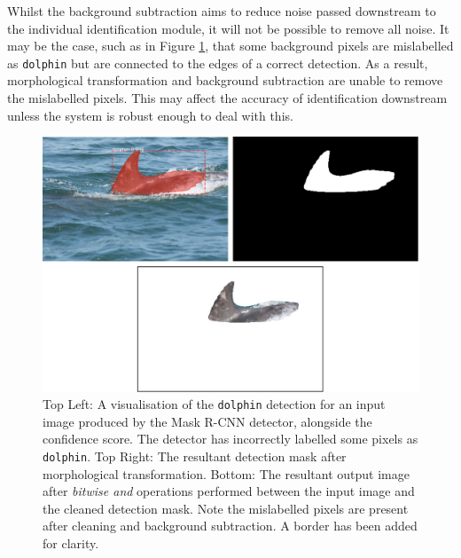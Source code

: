 Whilst the background subtraction aims to reduce noise passed downstream to the individual identification module, it will not be possible to remove all noise. It may be the case, such as in Figure \ref{fig:fin-extraction-unclean}, that some background pixels are mislabelled as \texttt{dolphin} but are connected to the edges of a correct detection. As a result, morphological transformation and background subtraction are unable to remove the mislabelled pixels. This may affect the accuracy of identification downstream unless the system is robust enough to deal with this.

\begin{figure}
	\begin{center}
		\includegraphics[scale=0.5]{Chapter3/figs/fin-extraction-unclean-uncropped.png}
	\end{center}
	\caption[Top Left: A visualisation of the \texttt{dolphin} detection for an input image produced by the Mask R-CNN detector, alongside the confidence score. Top Right: The resultant detection mask after morphological transformation. Bottom: The resultant output image after \textit{bitwise and} operations performed between the input image and the cleaned detection mask.]{Top Left: A visualisation of the \texttt{dolphin} detection for an input image produced by the Mask R-CNN detector, alongside the confidence score. The detector has incorrectly labelled some pixels as \texttt{dolphin}. Top Right: The resultant detection mask after morphological transformation. Bottom: The resultant output image after \textit{bitwise and} operations performed between the input image and the cleaned detection mask. Note the mislabelled pixels are present after cleaning and background subtraction. A border has been added for clarity.}
	\label{fig:fin-extraction-unclean}
\end{figure}

